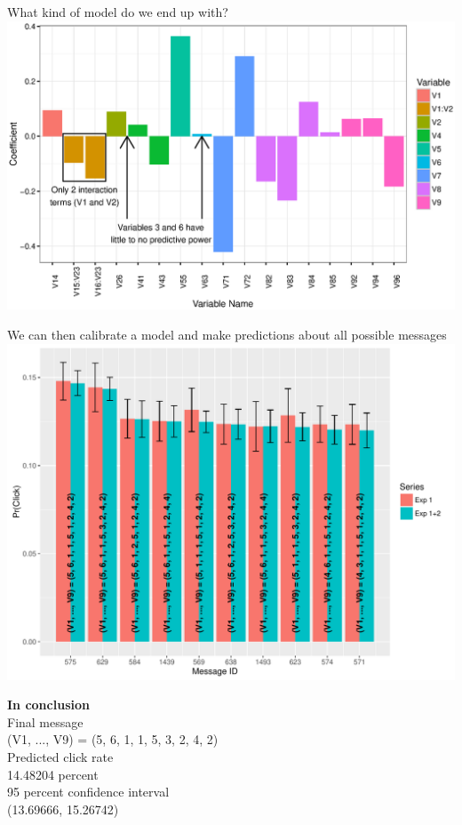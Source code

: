 \documentclass[11pt,xcolor=svgnames]{beamer}
\newcommand{\nv}{\color{Navy}}
\begin{document}
{\begin{frame}
What kind of model do we end up with?
\includegraphics[width=\textwidth]{coef_all.eps}
\end{frame}

\begin{frame}
We can then calibrate a model and make predictions about all possible messages
\includegraphics[width=\textwidth]{barplot.pdf}
\end{frame}

\begin{frame}
\textbf{\Large \nv In conclusion}\\
\vspace{0.2in}
Final message\\
(V1, ..., V9) = (5, 6, 1, 1, 5, 3, 2, 4, 2)\\
\vspace{0.2in}
Predicted click rate\\
14.48204 percent\\
\vspace{0.2in}
95 percent confidence interval\\
(13.69666, 15.26742)
\end{frame}

}
\end{document}
